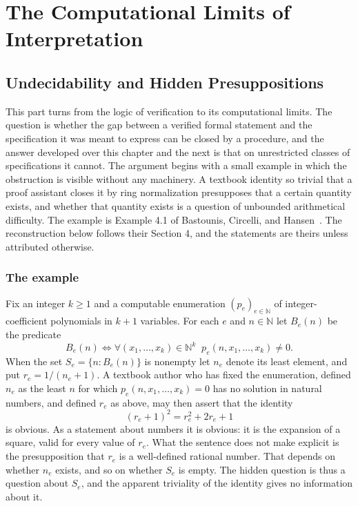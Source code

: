 \setcounter{part}{2}
\part{The Computational Limits of Interpretation}

\chapter{Undecidability and Hidden Presuppositions}
\label{ch:hidden}

This part turns from the logic of verification to its computational limits. The question is whether the gap between a verified formal statement and the specification it was meant to express can be closed by a procedure, and the answer developed over this chapter and the next is that on unrestricted classes of specifications it cannot. The argument begins with a small example in which the obstruction is visible without any machinery. A textbook identity so trivial that a proof assistant closes it by ring normalization presupposes that a certain quantity exists, and whether that quantity exists is a question of unbounded arithmetical difficulty. The example is Example 4.1 of Bastounis, Circelli, and Hansen~\cite{BCH26}. The reconstruction below follows their Section 4, and the statements are theirs unless attributed otherwise.

\section{The example}

Fix an integer $k \ge 1$ and a computable enumeration $(p_e)_{e \in \mathbb{N}}$ of integer-coefficient polynomials in $k+1$ variables. For each $e$ and $n \in \mathbb{N}$ let $B_e(n)$ be the predicate
\[
B_e(n) \iff \forall (x_1, \dots, x_k) \in \mathbb{N}^k \;\; p_e(n, x_1, \dots, x_k) \neq 0 .
\]
When the set $S_e = \{n : B_e(n)\}$ is nonempty let $n_e$ denote its least element, and put $r_e = 1/(n_e + 1)$. A textbook author who has fixed the enumeration, defined $n_e$ as the least $n$ for which $p_e(n, x_1, \dots, x_k) = 0$ has no solution in natural numbers, and defined $r_e$ as above, may then assert that the identity
\[
(r_e + 1)^2 = r_e^2 + 2 r_e + 1
\]
is obvious. As a statement about numbers it is obvious: it is the expansion of a square, valid for every value of $r_e$. What the sentence does not make explicit is the presupposition that $r_e$ is a well-defined rational number. That depends on whether $n_e$ exists, and so on whether $S_e$ is empty. The hidden question is thus a question about $S_e$, and the apparent triviality of the identity gives no information about it.


